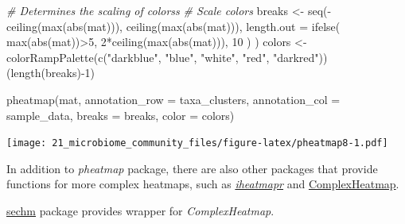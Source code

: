 \documentclass[
]{book}
\newenvironment{Shaded}{\begin{snugshade}}{\end{snugshade}}
\newcommand{\AttributeTok}[1]{\textcolor[rgb]{0.77,0.63,0.00}{#1}}
\newcommand{\CommentTok}[1]{\textcolor[rgb]{0.56,0.35,0.01}{\textit{#1}}}
\newcommand{\DecValTok}[1]{\textcolor[rgb]{0.00,0.00,0.81}{#1}}
\newcommand{\FunctionTok}[1]{\textcolor[rgb]{0.00,0.00,0.00}{#1}}
\newcommand{\NormalTok}[1]{#1}
\newcommand{\OtherTok}[1]{\textcolor[rgb]{0.56,0.35,0.01}{#1}}
\newcommand{\SpecialCharTok}[1]{\textcolor[rgb]{0.00,0.00,0.00}{#1}}
\newcommand{\StringTok}[1]{\textcolor[rgb]{0.31,0.60,0.02}{#1}}
\begin{document}
\begin{Shaded}
\begin{Highlighting}[]
\CommentTok{\# Determines the scaling of colorss}
\CommentTok{\# Scale colors}
\NormalTok{breaks }\OtherTok{\textless{}{-}} \FunctionTok{seq}\NormalTok{(}\SpecialCharTok{{-}}\FunctionTok{ceiling}\NormalTok{(}\FunctionTok{max}\NormalTok{(}\FunctionTok{abs}\NormalTok{(mat))), }\FunctionTok{ceiling}\NormalTok{(}\FunctionTok{max}\NormalTok{(}\FunctionTok{abs}\NormalTok{(mat))), }
              \AttributeTok{length.out =} \FunctionTok{ifelse}\NormalTok{( }\FunctionTok{max}\NormalTok{(}\FunctionTok{abs}\NormalTok{(mat))}\SpecialCharTok{\textgreater{}}\DecValTok{5}\NormalTok{, }\DecValTok{2}\SpecialCharTok{*}\FunctionTok{ceiling}\NormalTok{(}\FunctionTok{max}\NormalTok{(}\FunctionTok{abs}\NormalTok{(mat))), }\DecValTok{10}\NormalTok{ ) )}
\NormalTok{colors }\OtherTok{\textless{}{-}} \FunctionTok{colorRampPalette}\NormalTok{(}\FunctionTok{c}\NormalTok{(}\StringTok{"darkblue"}\NormalTok{, }\StringTok{"blue"}\NormalTok{, }\StringTok{"white"}\NormalTok{, }\StringTok{"red"}\NormalTok{, }\StringTok{"darkred"}\NormalTok{))(}\FunctionTok{length}\NormalTok{(breaks)}\SpecialCharTok{{-}}\DecValTok{1}\NormalTok{)}

\FunctionTok{pheatmap}\NormalTok{(mat, }\AttributeTok{annotation\_row =}\NormalTok{ taxa\_clusters, }
         \AttributeTok{annotation\_col =}\NormalTok{ sample\_data,}
         \AttributeTok{breaks =}\NormalTok{ breaks,}
         \AttributeTok{color =}\NormalTok{ colors)}
\end{Highlighting}
\end{Shaded}

\texttt{[image: 21\_microbiome\_community\_files/figure-latex/pheatmap8-1.pdf]}

In addition to \emph{pheatmap} package, there are also other packages that
provide functions for more complex heatmaps, such as \href{https://docs.ropensci.org/iheatmapr/articles/full_vignettes/iheatmapr.html}{\emph{iheatmapr}}
and
\href{https://academic.oup.com/bioinformatics/article/32/18/2847/1743594?login=true}{ComplexHeatmap}.

\href{http://www.bioconductor.org/packages/release/bioc/vignettes/sechm/inst/doc/sechm.html}{sechm}
package provides wrapper for \emph{ComplexHeatmap}.
\end{document}
